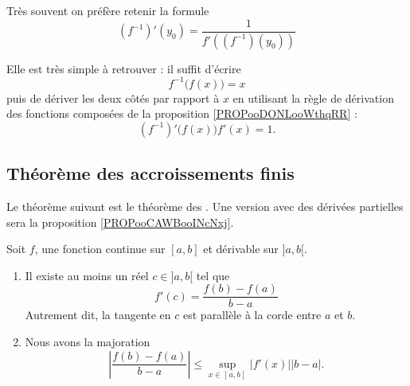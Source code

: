 \begin{normaltext}
	Très souvent on préfère retenir la formule
	\begin{equation}\label{EqWWAooBRFNsv}
		(f^{-1})'(y_0) = \frac{1}{f'\left((f^{-1})(y_0)\right)}
	\end{equation}

	Elle est très simple à retrouver : il suffit d'écrire
	\begin{equation}
		f^{-1}\big( f(x) \big)=x
	\end{equation}
	puis de dériver les deux côtés par rapport à \( x\) en utilisant la règle de dérivation des fonctions composées de la proposition \ref{PROPooDONLooWthqRR} :
	\begin{equation}
		(f^{-1})'\big( f(x) \big)f'(x)=1.
	\end{equation}
\end{normaltext}

\subsection{Théorème des accroissements finis}

Le théorème suivant est le théorème des . Une version avec des dérivées partielles sera la proposition \ref{PROPooCAWBooINcNxj}.
\begin{theorem}       \label{ThoAccFinis}
	Soit \( f\), une fonction continue sur \( [a,b]\) et dérivable sur \( ]a,b[\).
	\begin{enumerate}
		\item       \label{ITEMooFZONooXJqLyX}
		      Il existe au moins un réel \( c\in]a,b[\) tel que
		      \begin{equation}
			      f'(c)=\frac{ f(b)-f(a) }{ b-a }
		      \end{equation}
		      Autrement dit, la tangente en \( c\) est parallèle à la corde entre \( a\) et \( b\).
		\item       \label{ITEMooXRQKooDBFpdQ}
		      Nous avons la majoration
		      \begin{equation}
			      \left| \frac{ f(b)-f(a) }{ b-a } \right| \leq \sup_{x\in\mathopen] a , b \mathclose[}| f'(x) |  | b-a |.
		      \end{equation}
	\end{enumerate}
\end{theorem}

